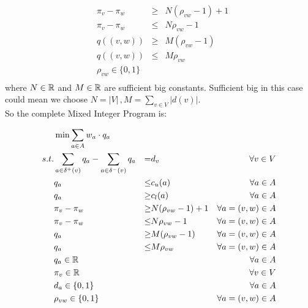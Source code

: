 \begin{align*}
 &\pi_v-\pi_w &\ge & N(\rho_{vw}-1)+1\\
 &\pi_v-\pi_w&\le &N\rho_{vw}-1 \\
 &q((v,w))&\ge& M(\rho_{vw}-1)\\
 &q((v,w))&\le & M\rho_{vw}\\
 &\rho_{vw} \in \{0,1\}&&\\
\end{align*}
where $N\in \mathbb{R}$ and $M\in \mathbb{R}$ are sufficient big constants. Sufficient big in this case could mean we choose 
$N=|V|\, ,M=\sum_{v\in V}|d(v)|$. \\
So the complete Mixed Integer Program is:

\begin{align*}
  &\min \sum_{a\in A} w_a\cdot q_a & \\
 s.t. & \sum_{a\in \delta^+(v)}q_a - \sum_{a\in\delta^- (v)}q_a &=& d_v\ &\forall v\in V \\
 & q_a &\le& c_u(a) & \forall a\in A\\
 & q_a &\ge& c_l(a) & \forall a\in A\\
 & \pi_v-\pi_w &\ge & N(\rho_{vw}-1)+1& \forall a=(v,w)\in A\\
 & \pi_v-\pi_w&\le &N\rho_{vw}-1& \forall a=(v,w)\in A\\
 & q_a&\ge& M(\rho_{vw}-1)& \forall a=(v,w)\in A\\
 & q_a&\le & M\rho_{vw}& \forall a=(v,w)\in A\\
 & q_a \in \mathbb{R} & & &\forall a\in A\\
 & \pi_v \in \mathbb{R} & & & \forall v\in V\\
 & d_a \in \{0,1\} & & &\forall a\in A\\
 & \rho_{vw} \in \{0,1\}&&& \forall a=(v,w)\in A\\
\end{align*}

